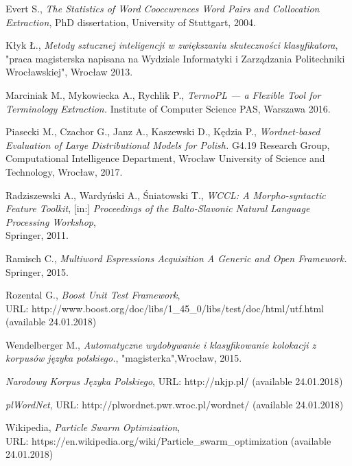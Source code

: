 \begin{thebibliography}{9}

Evert S.,
\textit{The Statistics of Word Cooccurences Word Pairs and Collocation Extraction}, 
PhD dissertation, University of Stuttgart, 2004.

Kłyk Ł., \emph{Metody sztucznej inteligencji w zwiększaniu skuteczności klasyfikatora}, \\
"praca magisterska napisana na Wydziale Informatyki i Zarządzania Politechniki Wrocławskiej", Wrocław 2013.

Marciniak M., Mykowiecka A., Rychlik P.,
\textit{TermoPL — a Flexible Tool for Terminology Extraction.} 
Institute of Computer Science PAS, Warszawa 2016.

Piasecki M., Czachor G., Janz A., Kaszewski D., Kędzia P.,
\textit{Wordnet-based Evaluation of Large Distributional Models for Polish.} 
G4.19 Research Group, Computational Intelligence Department, Wrocław University of Science and Technology, Wrocław, 2017.

Radziszewski A., Wardyński A., Śniatowski T., \emph{WCCL: A Morpho-syntactic Feature Toolkit}, [in:] \emph{Proceedings of the Balto-Slavonic Natural Language Processing Workshop}, \\
Springer, 2011.

Ramisch C., 
\textit{Multiword Espressions Acquisition A Generic and Open Framework.} 
Springer, 2015.

Rozental G., \textit{Boost Unit Test Framework}, \\
URL: http://www.boost.org/doc/libs/1\_45\_0/libs/test/doc/html/utf.html (available 24.01.2018)

Wendelberger M., 
\textit{Automatyczne wydobywanie i klasyfikowanie kolokacji z korpusów języka polskiego.}, 
"magisterka",Wrocław, 2015.

\textit{Narodowy Korpus Języka Polskiego}, 
URL: http://nkjp.pl/ (available 24.01.2018)

\textit{plWordNet}, 
URL: http://plwordnet.pwr.wroc.pl/wordnet/ (available 24.01.2018)

Wikipedia, \textit{Particle Swarm Optimization}, \\
URL: https://en.wikipedia.org/wiki/Particle\_swarm\_optimization (available 24.01.2018)


\end{thebibliography}